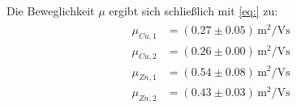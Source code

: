 Die Beweglichkeit $\mu$ ergibt sich schließlich mit \eqref{eq:} zu:
\begin{align}
\begin{aligned}
\mu_{Cu,1} &= (0.27 \pm 0.05) \, \si{\meter^2 \per \volt \second}  \\%
\mu_{Cu,2} &= (0.26 \pm 0.00) \, \si{\meter^2 \per \volt \second}  \\
\mu_{Zn,1} &= (0.54 \pm 0.08) \, \si{\meter^2 \per \volt \second}  \\
\mu_{Zn,2} &= (0.43 \pm 0.03) \, \si{\meter^2 \per \volt \second}
\end{aligned}
\end{align}

